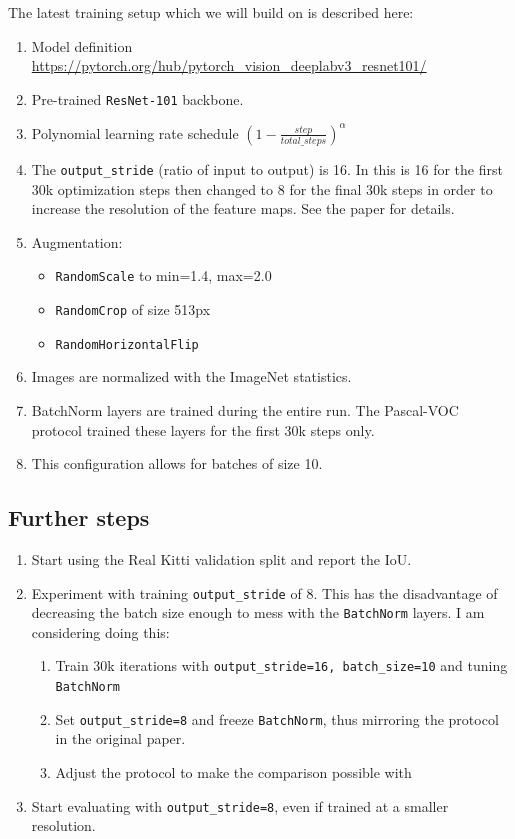 \documentclass[10pt,a4paper]{article} %
\begin{document}
The latest training setup which we will build on is described here:
\begin{enumerate}
   \item Model definition \url{https://pytorch.org/hub/pytorch_vision_deeplabv3_resnet101/}
   \item Pre-trained \texttt{ResNet-101} backbone.
   \item Polynomial learning rate schedule $(1 - \frac{step}{total\_steps})^{\alpha}$
   \item The \texttt{output\_stride} (ratio of input to output) is 16. In
   \cite{chen2017rethinking} this is 16 for the first 30k optimization steps
   then changed to 8 for the final 30k steps in order to increase the
   resolution of the feature maps. See the paper for details.
   \item Augmentation:
      \begin{itemize}
         \item \texttt{RandomScale} to min=1.4, max=2.0
         \item \texttt{RandomCrop} of size 513px
         \item \texttt{RandomHorizontalFlip}
      \end{itemize}
   \item Images are normalized with the ImageNet statistics.
   \item BatchNorm layers are trained during the entire run. The Pascal-VOC
   protocol trained these layers for the first 30k steps only.
   \item This configuration allows for batches of size 10.
\end{enumerate}

\subsection{Further steps}
\label{sub:further_steps}

\begin{enumerate}
   \item Start using the Real Kitti validation split and report the IoU.
   \item Experiment with training \texttt{output\_stride} of 8. This has the
   disadvantage of decreasing the batch size enough to mess with the
   \texttt{BatchNorm} layers. I am considering doing this:
   \begin{enumerate}
      \item Train 30k iterations with \texttt{output\_stride=16,
      batch\_size=10} and tuning \texttt{BatchNorm}
      \item Set \texttt{output\_stride=8} and freeze \texttt{BatchNorm}, thus
      mirroring the protocol in the original paper.
   \item Adjust the protocol to make the comparison possible with
   \cite{chen2018learning}
   \end{enumerate}
   \item Start evaluating with \texttt{output\_stride=8}, even if trained at
   a smaller resolution.
\end{enumerate}

\clearpage
\nocite{*}
\printbibliography
{}
\end{document}
